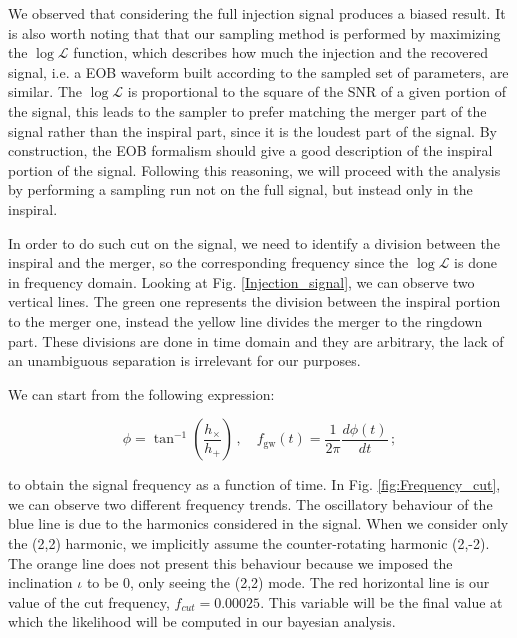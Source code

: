 We observed that considering the full injection signal produces a biased result. It is also worth noting that that our sampling method is performed by maximizing the $\log \mathcal{L}$ function, which describes how much the injection and the recovered signal, i.e. a EOB waveform built according to the sampled set of parameters, are similar. The $\log \mathcal{L}$ is proportional to the square of the SNR of a given portion of the signal, this leads to the sampler to prefer matching the merger part of the signal rather than the inspiral part, since it is the loudest part of the signal. By construction, the EOB formalism should give a good description of the inspiral portion of the signal. Following this reasoning, we will proceed with the analysis by performing a sampling run not on the full signal, but instead only in the inspiral. 

In order to do such cut on the signal, we need to identify a division between the inspiral and the merger, so the  corresponding frequency since the $\log \mathcal{L}$ is done in frequency domain. Looking at Fig. \ref{Injection_signal}, we can observe two vertical lines. The green one represents the division between the inspiral portion to the merger one, instead the yellow line divides the merger to the ringdown part. These divisions are done in time domain and they are arbitrary, the lack of an unambiguous separation is irrelevant for our purposes.

We can start from the following expression:

\begin{equation}
\phi = \tan^{-1} \left( \frac{ h_{\times}}{ h_{+}} \right) \,, \quad
f_{\text{gw}}(t) = \frac{1}{2\pi} \frac{d\phi(t)}{dt} \,;
\end{equation}

\noindent
to obtain the signal frequency as a function of time. In Fig. \ref{fig:Frequency_cut}, we can observe two different frequency trends. The oscillatory behaviour of the blue line is due to the harmonics considered in the signal. When we consider only the (2,2) harmonic, we implicitly assume the counter-rotating harmonic (2,-2). The orange line does not present this behaviour because we imposed the inclination $\iota$ to be 0, only seeing the (2,2) mode.
The red horizontal line is our value of the cut frequency, $f_{cut} = 0.00025$. This variable will be the final value at which the likelihood will be computed in our bayesian analysis.

